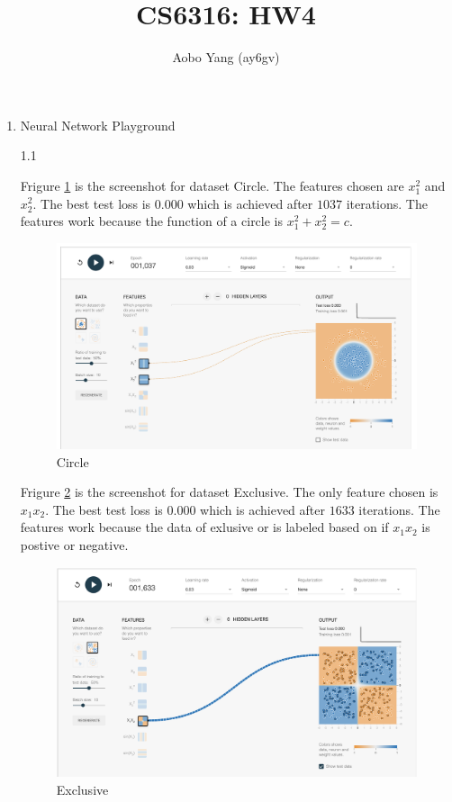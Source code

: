 \documentclass[11pt]{article}
\begin{document}
\author{Aobo Yang (ay6gv)}
\title{CS6316: HW4}
\maketitle

\medskip

\begin{enumerate}

\item
Neural Network Playground

1.1
\medskip

Frigure \ref{fig:circle} is the screenshot for dataset Circle. The features chosen are $x_1^2$ and $x_2^2$. The best test loss is $0.000$ which is achieved after $1037$ iterations. The features work because the function of a circle is $x_1^2 + x_2^2 = c$.

\begin{figure}[!h]
  \centering
  \includegraphics[width=\linewidth]{figures/1_1/circle.png}
  \caption{Circle}
  \label{fig:circle}
\end{figure}


Frigure \ref{fig:exclusive_or} is the screenshot for dataset Exclusive. The only feature chosen is $x_1x_2$. The best test loss is $0.000$ which is achieved after $1633$ iterations. The features work because the data of exlusive or is labeled based on if $x_1x_2$ is postive or negative.

\begin{figure}[!h]
  \centering
  \includegraphics[width=\linewidth]{figures/1_1/exclusive_or.png}
  \caption{Exclusive}
  \label{fig:exclusive_or}
\end{figure}


\end{enumerate}
\end{document}
